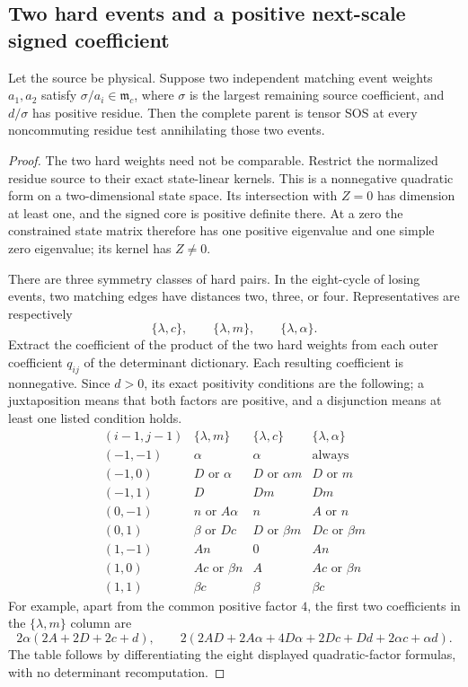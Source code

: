 \subsection{Two hard events and a positive next-scale signed coefficient}
\begin{proposition}\label{pf47f6a4e3a60:prop:two-hard-event}
Let the source be physical. Suppose two independent matching event weights $a_1,a_2$ satisfy $\sigma/a_i\in\mathfrak m_c$, where $\sigma$ is the largest remaining source coefficient, and $d/\sigma$ has positive residue. Then the complete parent is tensor SOS at every noncommuting residue test annihilating those two events.
\end{proposition}
\begin{proof}
The two hard weights need not be comparable. Restrict the normalized residue source to their exact state-linear kernels. This is a nonnegative quadratic form on a two-dimensional state space. Its intersection with $Z=0$ has dimension at least one, and the signed core is positive definite there. At a zero the constrained state matrix therefore has one positive eigenvalue and one simple zero eigenvalue; its kernel has $Z\ne0$.

There are three symmetry classes of hard pairs. In the eight-cycle of losing events, two matching edges have distances two, three, or four. Representatives are respectively
\[
 \{\lambda,c\},\qquad\{\lambda,m\},\qquad
 \{\lambda,\alpha\}.
\]
Extract the coefficient of the product of the two hard weights from each outer coefficient $q_{ij}$ of the determinant dictionary. Each resulting coefficient is nonnegative. Since $d>0$, its exact positivity conditions are the following; a juxtaposition means that both factors are positive, and a disjunction means at least one listed condition holds.
\[
\begin{array}{c|c|c|c}
(i-1,j-1)&\{\lambda,m\}&\{\lambda,c\}&\{\lambda,\alpha\}\\\hline
(-1,-1)&\alpha&\alpha&\text{always}\\
(-1,0)&D\text{ or }\alpha&D\text{ or }\alpha m&D\text{ or }m\\
(-1,1)&D&Dm&Dm\\
(0,-1)&n\text{ or }A\alpha&n&A\text{ or }n\\
(0,1)&\beta\text{ or }Dc&D\text{ or }\beta m&Dc\text{ or }\beta m\\
(1,-1)&An&0&An\\
(1,0)&Ac\text{ or }\beta n&A&Ac\text{ or }\beta n\\
(1,1)&\beta c&\beta&\beta c
\end{array}
\]
For example, apart from the common positive factor $4$, the first two coefficients in the $\{\lambda,m\}$ column are
\[
 2\alpha(2A+2D+2c+d),\qquad
 2(2AD+2A\alpha+4D\alpha+2Dc+Dd+2\alpha c+\alpha d).
\]
The table follows by differentiating the eight displayed quadratic-factor formulas, with no determinant recomputation.


\end{proof}
